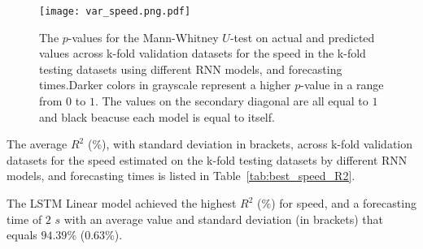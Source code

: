 \begin{figure}[!ht]
	\centering
	\texttt{[image: var\_speed.png.pdf]}
	\caption{The $p$-values for the Mann-Whitney $U$-test on actual and predicted values across k-fold validation datasets for the speed in the k-fold testing datasets using different RNN models, and forecasting times.Darker colors in grayscale represent a higher $p$-value in a range from $0$ to $1$. The values on the secondary diagonal are all equal to $1$ and black beacuse each model is equal to itself.}
	\label{fig:var_speed.png}
\end{figure}

The average $R^{2}$ (\%), with standard deviation in brackets, across k-fold validation datasets for the speed estimated on the k-fold testing datasets by different RNN models, and forecasting times is listed in Table~\ref{tab:best_speed_R2}.

\begin{table}[!ht]
	\centering
	\caption{The average $R^{2}$ (\%), with standard deviation in brackets, across k-fold validation datasets for the speed estimated on the k-fold testing datasets by different RNN models, and forecasting times.}
	\label{tab:best_speed_R2}
\end{table}

The LSTM Linear model achieved the highest $R^{2}$ (\%) for speed, and a forecasting time of $2$ $s$ with an average value and standard deviation (in brackets) that equals $94.39$\% ($0.63$\%).

